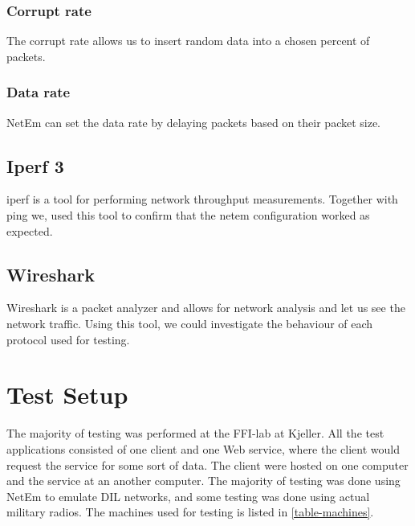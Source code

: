 \subsubsection{Corrupt rate}

The corrupt rate allows us to insert random data into a chosen percent of
packets.

\subsubsection{Data rate}

NetEm can set the data rate by delaying packets based on their packet size.

\subsection{Iperf 3}

iperf is a tool for performing network throughput measurements. Together with
ping we, used this tool to confirm that the \gls{netem} configuration worked as
expected.

\subsection{Wireshark}

Wireshark is a packet analyzer and allows for network analysis and let us see
the network traffic. Using this tool, we could investigate the behaviour of each
protocol used for testing.



\section{Test Setup}
\label{testing-environment}

The majority of testing was performed at the FFI-lab at Kjeller. All the test
applications consisted of one client and one Web service, where the client would
request the service for some sort of data. The client were hosted on one
computer and the service at an another computer. The majority of testing was
done using NetEm to emulate DIL networks, and some testing was done using actual
military radios. The machines used for testing is listed in
\cref{table-machines}.

